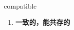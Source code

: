 
\begin{frame}
{\huge compatible}
\begin{center}
\begin{enumerate}\Large
  \item \textbf{一致的，能共存的}
\end{enumerate}
\end{center}
\end{frame}
